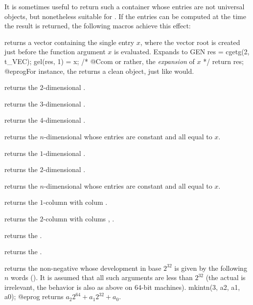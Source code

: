 \smallskip

It is sometimes useful to return such a container whose entries are not
universal objects, but nonetheless suitable for .
If the entries can be computed at the time the result is returned, the
following macros achieve this effect:

 returns a vector containing the single entry $x$,
where the vector root is created just before the function argument $x$ is
evaluated. Expands to
\bprog
  {
    GEN res = cgetg(2, t_VEC);
    gel(res, 1) = x; /* @Ccom or rather, the \emph{expansion} of $x$ */
    return res;
  }
@eprog\noindent For instance, the  returns a clean
object, just like  would.

returns the $2$-dimensional  \kbd{[x,y]}.

returns the $3$-dimensional  \kbd{[x,y,z]}.

returns the $4$-dimensional  \kbd{[x,y,z,t]}.

returns the $n$-dimensional  whose entries are constant and all
equal to $x$.

returns the $1$-dimensional  \kbd{[x]~}.

returns the $2$-dimensional  \kbd{[x,y]~}.

returns the $n$-dimensional  whose entries are constant and all
equal to $x$.

returns the $1$-column  with colum .

returns the $2$-column  with colums , .

returns the  .

returns the  .

\smallskip

 returns the non-negative  whose
development in base $2^{32}$ is given by the following $n$ words
(). It is assumed that all such arguments are less than
$2^{32}$ (the actual  is irrelevant, the behavior is also
as above on $64$-bit machines).
\bprog
  mkintn(3, a2, a1, a0);
@eprog
\noindent returns $a_2 2^{64} + a_1 2^{32} + a_0$.

